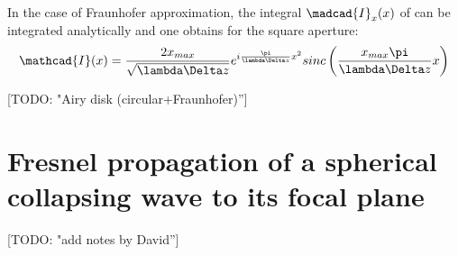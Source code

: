 \documentclass{iucr}              %
\newcommand{\todo}[1]{{\color{red}[TODO: "#1'']}}
\begin{document}
In the case of Fraunhofer approximation, the integral $\madcad{I}_x(x)$ of \cite{goodmanfourier} can be integrated analytically and one obtains for the square aperture: 
\begin{equation}
\mathcad{I}(x) = \frac{2 x_{max}}{\sqrt{\lambda \Delta z}} e^{i \frac{\pi}{\lambda \Delta z} x^2 } sinc\left( \frac{x_{max}  \pi}{\lambda \Delta z} x \right) 
\end{equation}

\todo{Airy disk (circular+Fraunhofer)}

\section{Fresnel propagation of a spherical collapsing wave to its focal plane}
\todo{add notes by David}








%

% 
% 
% 
% 
\end{document}
